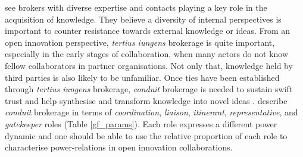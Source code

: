 \citet{cohen1990absorptive} see brokers with diverse expertise and contacts playing a key role in the acquisition of knowledge. They believe a diversity of internal perspectives is important to counter resistance towards external knowledge or ideas. From an open innovation perspective, \emph{tertius iungens} brokerage is quite important, especially in the early stages of collaboration, when many actors do not know fellow collaborators in partner organisations. Not only that, knowledge held by third parties is also likely to be unfamiliar. Once ties have been established through \emph{tertius iungens} brokerage, \emph{conduit} brokerage is needed to sustain swift trust and help synthesise and transform knowledge into novel ideas \citep{fleming2007collaborative,lingo2010nexus,quintane2016brokers}. \citet{gould1989structures} describe \emph{conduit} brokerage in terms of \emph{coordination}, \emph{liaison}, \emph{itinerant}, \emph{representative}, and \emph{gatekeeper} roles (Table \ref{gf_params}). Each role expresses a different power dynamic and one should be able to use the relative proportion of each role to characterise power-relations in open innovation collaborations. \medskip

